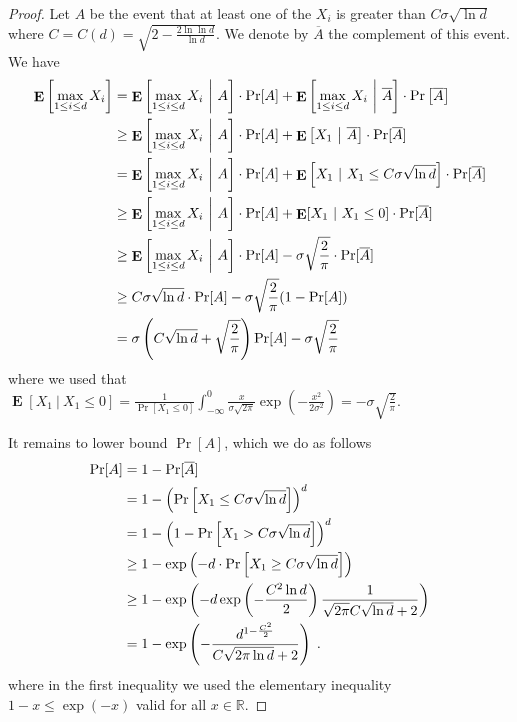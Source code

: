 \documentclass{article}
\DeclareMathOperator*{\Exp}{\mathbf{E}}
\newcommand{\field}[1]{\mathbb{#1}}
\newcommand{\R}{\field{R}}
\begin{document}
\begin{proof}
Let $A$ be the event that at least one of the $X_i$ is greater than $C \sigma
\sqrt{\ln d}$ where $C = C(d) = \sqrt{2 - \frac{2 \ln \ln d}{\ln d}}$. We
denote by $\overline{A}$ the complement of this event. We have
\begin{align}
\Exp \left[ \max_{1 \le i \le d} X_i \right]
& = \Exp \left[ \max_{1 \le i \le d} X_i ~ \middle|~ A \right] \cdot \Pr[A] + \Exp \left[ \max_{1 \le i \le d} X_i ~\middle|~ \overline{A} \right] \cdot \Pr \left[ \overline{A} \right] \notag \\
& \ge \Exp \left[ \max_{1 \le i \le d} X_i ~\middle|~ A \right] \cdot \Pr[A] + \Exp \left[ X_1 ~\middle|~ \overline{A} \right] \cdot \Pr[\overline{A}] \notag \\
& = \Exp \left[ \max_{1 \le i \le d} X_i~\middle|~ A \right] \cdot \Pr[A] + \Exp \left[ X_1~|~ X_1 \le C \sigma \sqrt{\ln d} \right] \cdot \Pr[\overline{A}] \notag \\
& \ge \Exp \left[ \max_{1 \le i \le d} X_i~\middle|~ A \right] \cdot \Pr[A] + \Exp[X_1~|~ X_1 \le 0] \cdot \Pr[\overline{A}] \notag \\
& \ge \Exp \left[ \max_{1 \le i \le d} X_i~\middle|~ A \right] \cdot \Pr[A] - \sigma \sqrt{\frac{2}{\pi}} \cdot \Pr[\overline{A}] \notag \\
& \ge C \sigma \sqrt{\ln d} \cdot \Pr[A] - \sigma \sqrt{\frac{2}{\pi}} (1 - \Pr[A]) \notag \\
& = \sigma \left(C\sqrt{\ln d} + \sqrt{\frac{2}{\pi}}\right) \Pr[A] -  \sigma \sqrt{\frac{2}{\pi}} \label{equation:maximum-of-gaussians-lower-bound-3}
\end{align}
where we used that $\Exp[X_1 ~|~ X_1 \le 0] = \frac{1}{\Pr[X_1 \le 0]} \int_{-\infty}^0 \frac{x}{\sigma \sqrt{2\pi}} \exp \left(- \frac{x^2}{2\sigma^2} \right) = - \sigma \sqrt{\frac{2}{\pi}}$.

It remains to lower bound $\Pr[A]$, which we do as follows
\begin{align}
\Pr[A]
& = 1 - \Pr[\overline{A}] \notag \\
& = 1 - \left( \Pr \left[ X_1 \le C \sigma \sqrt{\ln d} \right] \right)^d  \notag \\
& = 1 - \left(1 - \Pr\left[ X_1 > C \sigma \sqrt{\ln d} \right] \right)^d \notag \\
& \ge 1 - \exp\left(-d \cdot \Pr\left[X_1 \ge C \sigma \sqrt{\ln d} \right]\right) \notag \\
& \ge 1 - \exp\left(-d \exp\left(-\frac{C^2 \ln d}{2}\right) \frac{1}{\sqrt{2\pi}C \sqrt{\ln d}+2} \right) \notag \\
& = 1 - \exp\left(-\frac{d^{1-\frac{C^2}{2}}}{C \sqrt{2\pi \ln d}+2}\right) \label{equation:maximum-of-gaussians-lower-bound-4} \; .
\end{align}
where in the first inequality we used the elementary inequality $1 - x \le \exp(-x)$ valid for all $x \in \R$.


\end{proof}
\end{document}
